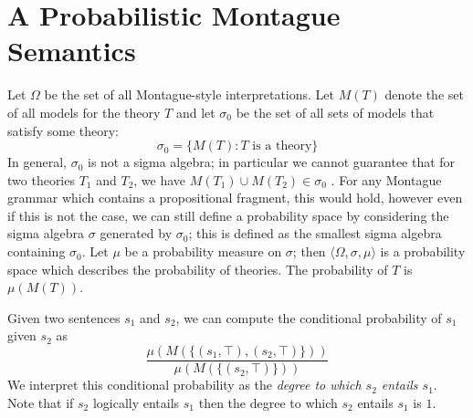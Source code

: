 \documentclass[11pt]{article}
\theoremstyle{definition}
\newcommand{\hide}[1]{}
\begin{document}


\section{A Probabilistic Montague Semantics}

\hide{In this section we describe our first model of a probabilistic
semantics for natural language. This approach  generalises Montague semantics to
the probabilistic domain in a natural way. 
}
Let $\Omega$ be the set of all Montague-style interpretations. Let
$M(T)$ denote the set of all models for the theory $T$ and let
$\sigma_0$ be the set of all sets of models that satisfy some theory:
$$\sigma_0 = \{M(T) : T\text{ is a theory}\}$$
In general, $\sigma_0$ is not a sigma algebra; in particular we cannot
guarantee that for two theories $T_1$
and $T_2$, we have
$M(T_1)\cup M(T_2) \in \sigma_0$ . For any Montague grammar which contains a propositional
fragment, this would hold, however even if this is not the case, we
can still define a probability space by considering the sigma algebra
$\sigma$ generated by $\sigma_0$; this is defined as the smallest
sigma algebra containing $\sigma_0$. Let $\mu$ be a probability measure on $\sigma$; then
$\langle\Omega,\sigma,\mu\rangle$ is a probability space which
describes the probability of theories. The probability of $T$ is
$\mu(M(T))$.


Given two sentences $s_1$ and $s_2$, we can compute the conditional
probability of $s_1$ given $s_2$ as
$$\frac{\mu(M(\{(s_1, \top), (s_2, \top)\}))}{\mu(M(\{(s_2,\top)\}))}$$
We interpret this conditional probability as the {\em degree to which $s_2$ entails $s_1$\/}. Note that if $s_2$ logically entails $s_1$ then the degree to which  $s_2$ entails $s_1$ is $1$.
\end{document}
